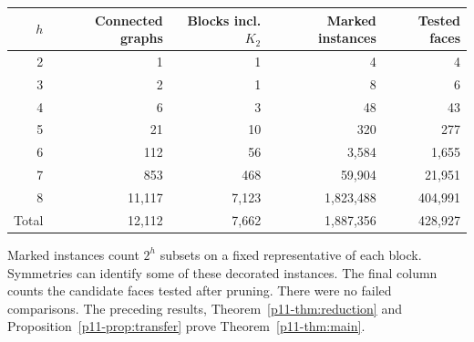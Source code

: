\documentclass[11pt,a4paper]{article}
\begin{document}
\begin{center}
\begin{tabular}{rrrrr}
\toprule
$h$ & Connected graphs & Blocks incl. $K_2$ & Marked instances & Tested faces\\
\midrule
2 & 1 & 1 & 4 & 4\\
3 & 2 & 1 & 8 & 6\\
4 & 6 & 3 & 48 & 43\\
5 & 21 & 10 & 320 & 277\\
6 & 112 & 56 & 3,584 & 1,655\\
7 & 853 & 468 & 59,904 & 21,951\\
8 & 11,117 & 7,123 & 1,823,488 & 404,991\\
\midrule
Total & 12,112 & 7,662 & 1,887,356 & 428,927\\
\bottomrule
\end{tabular}
\end{center}
Marked instances count $2^h$ subsets on a fixed representative of each block. Symmetries can identify some of these decorated instances. The final column counts the candidate faces tested after pruning. There were no failed comparisons. The preceding results, Theorem~\ref{p11-thm:reduction} and Proposition~\ref{p11-prop:transfer} prove Theorem~\ref{p11-thm:main}.
\end{document}
